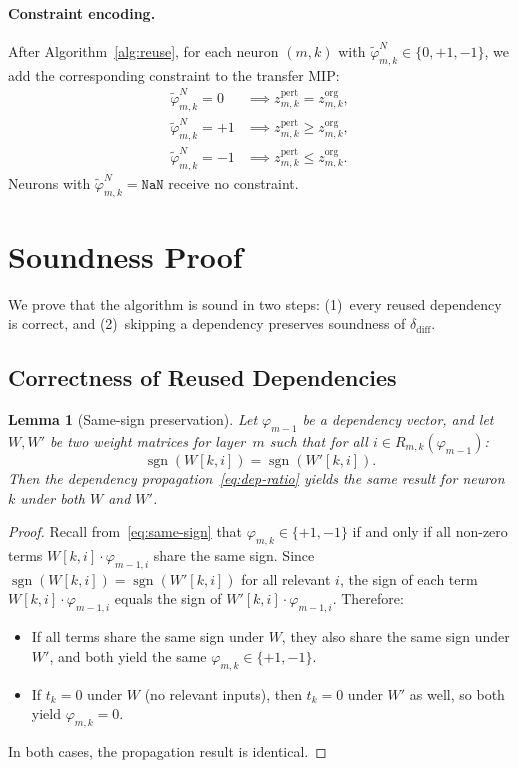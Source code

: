 \documentclass[11pt]{article}
\newtheorem{lemma}[theorem]{Lemma}
\theoremstyle{definition}
\newcommand{\dD}{\delta_{\mathrm{diff}}}
\newcommand{\sgn}{\operatorname{sgn}}
\begin{document}
\paragraph{Constraint encoding.}
After Algorithm~\ref{alg:reuse}, for each neuron $(m,k)$ with $\tilde{\varphi}_{m,k}^{N} \in \{0, +1, -1\}$, we add the corresponding constraint to the transfer MIP:
\begin{align*}
  \tilde{\varphi}_{m,k}^{N} = 0 &\implies z_{m,k}^{\mathrm{pert}} = z_{m,k}^{\mathrm{org}}, \\
  \tilde{\varphi}_{m,k}^{N} = +1 &\implies z_{m,k}^{\mathrm{pert}} \ge z_{m,k}^{\mathrm{org}}, \\
  \tilde{\varphi}_{m,k}^{N} = -1 &\implies z_{m,k}^{\mathrm{pert}} \le z_{m,k}^{\mathrm{org}}.
\end{align*}
Neurons with $\tilde{\varphi}_{m,k}^{N} = \mathtt{NaN}$ receive no constraint.

\section{Soundness Proof}
\label{sec:proof}

We prove that the algorithm is sound in two steps: (1)~every reused dependency is correct, and (2)~skipping a dependency preserves soundness of $\dD$.

\subsection{Correctness of Reused Dependencies}

\begin{lemma}[Same-sign preservation]
  \label{lem:sign}
  Let $\varphi_{m-1}$ be a dependency vector, and let $W, W'$ be two weight matrices for layer~$m$ such that for all $i \in R_{m,k}(\varphi_{m-1})$:
  \[
    \sgn(W[k,i]) = \sgn(W'[k,i]).
  \]
  Then the dependency propagation~\eqref{eq:dep-ratio} yields the same result for neuron $k$ under both $W$ and $W'$.
\end{lemma}

\begin{proof}
  Recall from~\eqref{eq:same-sign} that $\varphi_{m,k} \in \{+1, -1\}$ if and only if all non-zero terms $W[k,i] \cdot \varphi_{m-1,i}$ share the same sign. Since $\sgn(W[k,i]) = \sgn(W'[k,i])$ for all relevant $i$, the sign of each term $W[k,i] \cdot \varphi_{m-1,i}$ equals the sign of $W'[k,i] \cdot \varphi_{m-1,i}$. Therefore:
  \begin{itemize}
    \item If all terms share the same sign under $W$, they also share the same sign under $W'$, and both yield the same $\varphi_{m,k} \in \{+1, -1\}$.
    \item If $t_k = 0$ under $W$ (no relevant inputs), then $t_k = 0$ under $W'$ as well, so both yield $\varphi_{m,k} = 0$.
  \end{itemize}
  In both cases, the propagation result is identical.
\end{proof}
\end{document}
